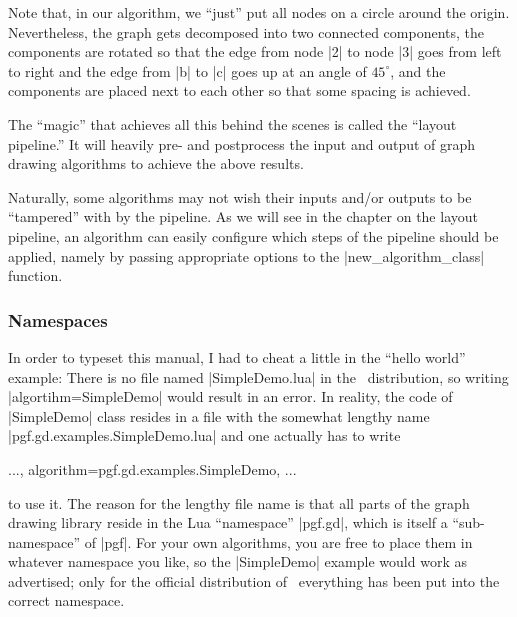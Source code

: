 Note that, in our algorithm, we ``just'' put all nodes on a circle
around the origin. Nevertheless, the graph gets decomposed into two
connected components, the components are rotated so that the edge from
node |2| to node |3| goes from left to right and the edge from |b| to
|c| goes up at an angle of $45^\circ$, and the components are placed
next to each other so that some spacing is achieved.

The ``magic'' that achieves all this behind the scenes is called the
``layout pipeline.'' It will heavily pre- and postprocess the input
and output of graph drawing algorithms to achieve the above results.

Naturally, some algorithms may not wish their inputs and/or
outputs to be ``tampered'' with by the pipeline. As we will see in the
chapter on the layout pipeline, an algorithm can easily configure
which steps of the pipeline should be applied, namely by passing
appropriate options to the |new_algorithm_class| function.



\subsubsection{Namespaces}

In order to typeset this manual, I had to cheat a little in the
``hello world'' example: There is no file named |SimpleDemo.lua| in
the \pgfname\ distribution, so writing |algortihm=SimpleDemo| would
result in an error. In reality, the code of |SimpleDemo| class resides
in a file with the somewhat lengthy name
|pgf.gd.examples.SimpleDemo.lua| and one actually has to write
\begin{codeexample}
..., algorithm=pgf.gd.examples.SimpleDemo, ...
\end{codeexample}
\noindent
to use it. The reason for the lengthy file name is that all parts of
the graph drawing library reside in the Lua ``namespace'' |pgf.gd|,
which is itself a ``sub-namespace'' of |pgf|. For your own algorithms,
you are free to place them in whatever namespace you like, so the
|SimpleDemo| example would work as advertised; only for the official
distribution of \pgfname\ everything has been put into the correct
namespace.

